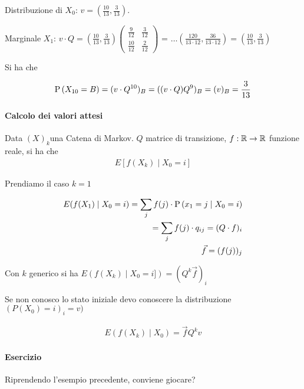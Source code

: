 Distribuzione di $ X_0 $: $ v = (\frac{10}{13}, \frac{3}{13}) $.

Marginale $ X_1 $: $ v \cdot Q = (\frac{10}{13}, \frac{3}{13})\begin{pmatrix}
\frac{9}{12} & \frac{3}{12} \\
\frac{10}{12} & \frac{2}{12}
\end{pmatrix} $ = $\hdots (\frac{120}{13 \cdot 12}, \frac{36}{13 \cdot 12}) = \left( \frac{10}{13}, \frac{3}{13} \right)$

Si ha che 

\[ \begin{aligned}
\text{P}\left(X_{10} = B\right) = (v \cdot Q^{10})_B = ((v \cdot Q) Q^9)_B = (v)_B = {\dfrac{3}{13}} 
\end{aligned} \]

\paragraph{Calcolo dei valori attesi}

Data $ (X)_k $una Catena di Markov. $ Q $ matrice di transizione, $ f : \mathbb{R} \to \mathbb{R}$ funzione reale, si ha che
\[ \begin{aligned}
E[f(X_k) \mid X_0 = i]
\end{aligned} \]

Prendiamo il caso $ k = 1 $

\[ \begin{aligned}
E(f(X_1) \mid X_0 = i) = \sum_j f(j) \cdot \text{P}\left(x_1 = j \mid X_0 = i\right) \\
= \sum_j f(j) \cdot q_{ij} = (Q \cdot f)_i \\
\vec{f} = (f(j))_j
\end{aligned} \]

Con $ k $ generico si ha $E(f(X_k) \mid X_0 = i]) = (Q^k \vec{f})_i $

Se non conosco lo stato iniziale devo conoscere la distribuzione $ (P(X_0) =i)_i = v) $

\[ \begin{aligned}
E(f(X_k) \mid X_0) = \vec{f} Q^k v
\end{aligned} \]

\paragraph{Esercizio}
Riprendendo l'esempio precedente, conviene giocare?

